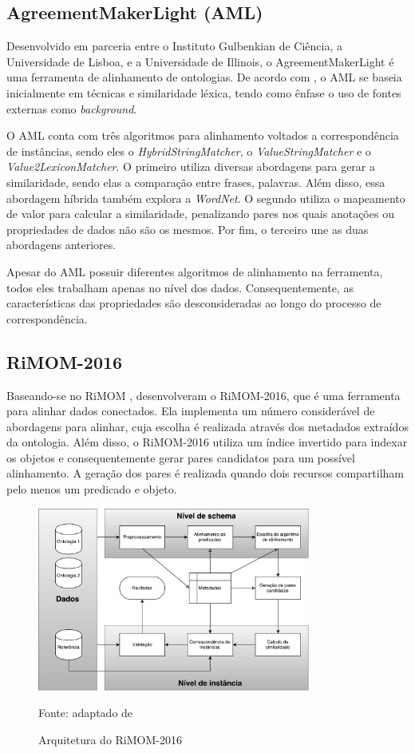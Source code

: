 \subsection{AgreementMakerLight (AML)}
Desenvolvido em parceria entre o Instituto Gulbenkian de Ciência, a Universidade de Lisboa, e a Universidade de Illinois, o AgreementMakerLight é uma ferramenta de alinhamento de ontologias. De acordo com \cite{fariaoaei}, o AML se baseia inicialmente em técnicas e similaridade léxica, tendo como ênfase o uso de fontes externas como \textit{background}.

O AML conta com três algoritmos para alinhamento voltados a correspondência de instâncias, sendo eles o \textit{HybridStringMatcher}, o \textit{ValueStringMatcher} e o \textit{Value2LexiconMatcher}. O primeiro utiliza diversas abordagens para gerar a similaridade, sendo elas a comparação entre frases, palavras. Além disso, essa abordagem híbrida também explora a \textit{WordNet}. O segundo utiliza o mapeamento de valor para calcular a similaridade, penalizando pares nos quais anotações ou propriedades de dados não são os mesmos. Por fim, o terceiro une as duas abordagens anteriores.

Apesar do AML possuir diferentes algoritmos de alinhamento na ferramenta, todos eles trabalham apenas no nível dos dados. Consequentemente, as características das propriedades são desconsideradas ao longo do processo de correspondência.

\subsection{RiMOM-2016}
Baseando-se no RiMOM  \cite{li2009rimom},  desenvolveram o RiMOM-2016, que é uma ferramenta para alinhar dados conectados. Ela implementa um número considerável de abordagens para alinhar, cuja escolha é realizada através dos metadados extraídos da ontologia. Além disso, o RiMOM-2016 utiliza um índice invertido para indexar os objetos e consequentemente gerar pares candidatos para um possível alinhamento. A geração dos pares é realizada quando dois recursos compartilham pelo menos um predicado e objeto.

\begin{figure}[!ht]
	\centering
	\includegraphics[width=0.8\textwidth]{./imagens/rimom_2016.pdf}
    \caption{Arquitetura do RiMOM-2016}
	\footnotesize{Fonte: adaptado de \cite{zhang2016rimom}}
	\label{fig:rimom}
\end{figure}

